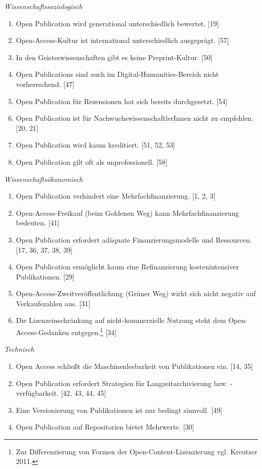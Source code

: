 \documentclass[a4paper,
fontsize=11pt,
oneside,
numbers=noperiodatend,
parskip=half-,
bibliography=totoc,
final
]{scrartcl}
\begin{document}
\emph{Wissenschaftssoziologisch}

\begin{enumerate}
\def\labelenumi{(\arabic{enumi})}
\item
  Open Publication wird generational unterschiedlich bewertet. {[}19{]}
\item
  Open-Access-Kultur ist international unterschiedlich ausgeprägt. {[}57{]}
\item
  In den Geisteswissenschaften gibt es keine Preprint-Kultur. {[}50{]}
\item
  Open Publications sind auch im Digital-Humanities-Bereich nicht vorherrschend. {[}47{]}
\item
  Open Publication für Rezensionen hat sich bereits durchgesetzt. {[}54{]}
\item
  Open Publication ist für NachwuchswissenschaftlerInnen nicht zu empfehlen. {[}20, 21{]}
\item
  Open Publication wird kaum kreditiert. {[}51, 52, 53{]}
\item
  Open Publication gilt oft als unprofessionell. {[}58{]}
\end{enumerate}

\emph{Wissenschaftsökonomisch}

\begin{enumerate}
\def\labelenumi{(\arabic{enumi})}
\item
  Open Publication verhindert eine Mehrfachfinanzierung. {[}1, 2, 3{]}
\item
  Open-Access-Freikauf (beim Goldenen Weg) kann Mehrfachfinanzierung bedeuten. {[}41{]}
\item
  Open Publication erfordert adäquate Finanzierungsmodelle und Ressourcen. {[}17, 36, 37, 38, 39{]}
\item
  Open Publication ermöglicht kaum eine Refinanzierung kostenintensiver Publikationen. {[}29{]}
\item
  Open-Access-Zweitveröffentlichung (Grüner Weg) wirkt sich nicht negativ auf Verkaufszahlen aus. {[}31{]}
\item
  Die Lizenzeinschränkung auf nicht-kommerzielle Nutzung steht dem Open-Access-Ge\-danken entgegen.\footnote{Zur
    Differenzierung von Formen der Open-Content-Lizenzierung vgl.
    Kreutzer 2011.} {[}34{]}
\end{enumerate}

\emph{Technisch}

\begin{enumerate}
\def\labelenumi{(\arabic{enumi})}
\item
  Open Access schließt die Maschinenlesbarkeit von Publikationen ein. {[}14, 35{]}
\item
  Open Publication erfordert Strategien für Langzeitarchivierung bzw. -verfügbarkeit. {[}42, 43, 44, 45{]}
\item
  Eine Versionierung von Publikationen ist nur bedingt sinnvoll. {[}49{]}
\item
  Open Publication auf Repositorien bietet Mehrwerte. {[}30{]}
\end{enumerate}
\end{document}
